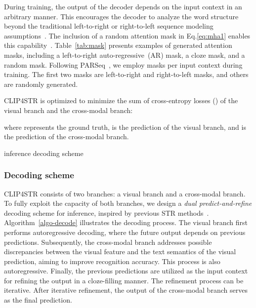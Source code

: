 \documentclass[lettersize,journal]{IEEEtran}
\begin{document}
During training, the output of the decoder depends on the input context in an arbitrary manner.
This encourages the decoder to analyze the word structure beyond the traditional left-to-right or right-to-left sequence modeling assumptions~\cite{2021_abinet}. 
The inclusion of a random attention mask  in Eq.\eqref{eq:mha1} enables this capability~\cite{2022_parseq}. 
Table~\ref{tab:mask} presents examples of generated attention masks, including a left-to-right auto-regressive~(AR) mask, a cloze mask, and a random mask.
Following PARSeq~\cite{2022_parseq}, we employ  masks per input context during training.
The first two masks are left-to-right and right-to-left masks, and others are randomly generated.

CLIP4STR is optimized to minimize the sum of cross-entropy losses () of the visual branch and the cross-modal branch:

where  represents the ground truth,
 is the prediction of the visual branch,
and  is the prediction of the cross-modal branch.


\begin{algorithm}[!t]
\caption{inference decoding scheme}
	\label{algo-decode}

        \;
        \;
        \;
        \For{ \KwTo }
        {
            \;
            \;
        }
        \;
        \;
        \For{ \KwTo }
        {
            \;
            \;
        }
        \For{ \KwTo }
        {
            \;
            \;
            \;
            \;
            \;
        }
\end{algorithm} 
\subsubsection{Decoding scheme}
CLIP4STR consists of two branches: a visual branch and a cross-modal branch.
To fully exploit the capacity of both branches, we design a \textit{dual predict-and-refine} decoding scheme for inference, inspired by previous STR methods~\cite{2021_abinet,2022_parseq}. 
Algorithm~\ref{algo-decode} illustrates the decoding process.
The visual branch first performs autoregressive decoding, where the future output depends on previous predictions.
Subsequently, the cross-modal branch addresses possible discrepancies between the visual feature and the text semantics of the visual prediction, aiming to improve recognition accuracy.
This process is also autoregressive.
Finally, the previous predictions are utilized as the input context for refining the output in a cloze-filling manner.
The refinement process can be iterative.
After iterative refinement, the output of the cross-modal branch serves as the final prediction.
\end{document}
